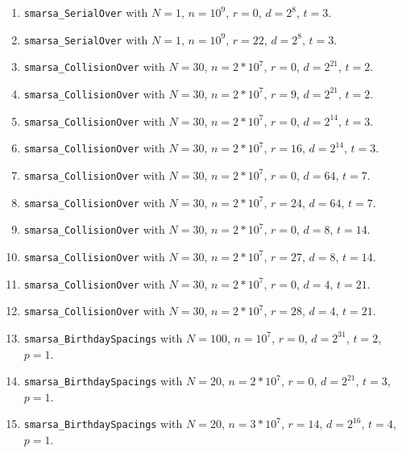   \begin{enumerate}
  \item {\tt smarsa\_SerialOver} with $N=1$,  $n=10^9$,  $r=0$,
  $d = 2^{8}$, $t=3$.

  \item {\tt smarsa\_SerialOver} with $N=1$,  $n=10^9$,  $r=22$,
  $d = 2^{8}$, $t=3$.

  \item {\tt smarsa\_CollisionOver} with $N=30$,  $n=2*10^7$,  $r=0$,
  $d = 2^{21}$, $t=2$.

  \item {\tt smarsa\_CollisionOver} with $N=30$,  $n=2*10^7$,  $r=9$,
  $d = 2^{21}$,  $t=2$.

  \item {\tt smarsa\_CollisionOver} with $N=30$,  $n=2*10^7$,  $r=0$,
  $d = 2^{14}$, $t=3$.

  \item {\tt smarsa\_CollisionOver} with $N=30$,  $n=2*10^7$,  $r=16$,
  $d = 2^{14}$,  $t=3$.

  \item {\tt smarsa\_CollisionOver} with $N=30$,  $n=2*10^7$,  $r=0$,
  $d = 64$, $t=7$.

  \item {\tt smarsa\_CollisionOver} with $N=30$,  $n=2*10^7$,  $r=24$,
  $d = 64$,  $t=7$.

  \item {\tt smarsa\_CollisionOver} with $N=30$,  $n=2*10^7$,  $r=0$,
  $d = 8$, $t=14$.

  \item {\tt smarsa\_CollisionOver} with $N=30$,  $n=2*10^7$,  $r=27$,
  $d = 8$,  $t=14$.

  \item {\tt smarsa\_CollisionOver} with $N=30$,  $n=2*10^7$,  $r=0$,
  $d =4$,  $t=21$.

  \item {\tt smarsa\_CollisionOver} with $N=30$,  $n=2*10^7$,  $r=28$,
  $d =4$,  $t=21$.

  \item {\tt smarsa\_BirthdaySpacings}  with $N=100$,  $n=10^7$, $r=0$,
   $d = 2^{31}$, $t=2$, $p=1$.

  \item {\tt smarsa\_BirthdaySpacings}  with $N=20$,  $n=2*10^7$, $r=0$,
   $d = 2^{21}$, $t=3$, $p=1$.

  \item {\tt smarsa\_BirthdaySpacings}  with $N=20$,  $n=3*10^7$, $r=14$,
   $d = 2^{16}$, $t=4$, $p=1$.


\end{enumerate}

